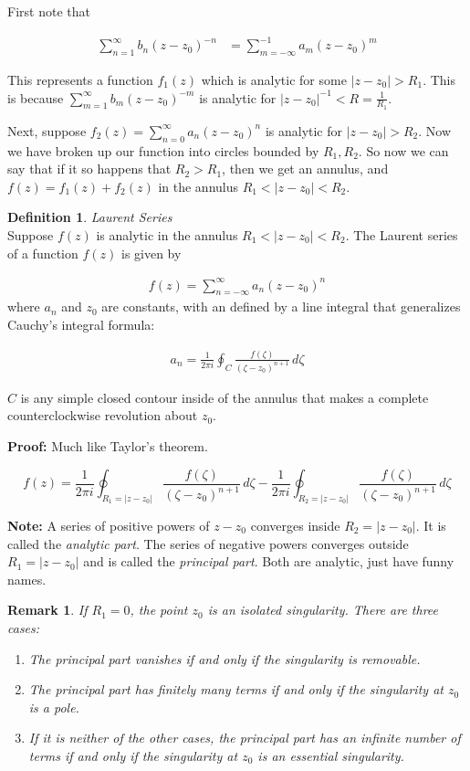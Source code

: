 \documentclass{article}
\newtheorem*{remark}{Remark}
\theoremstyle{definition}
\newtheorem{definition}{Definition}[section]
\newcommand{\Def}[2]{
\begin{shaded*}
\begin{definition}{\textit{#1}}\\#2\end{definition}
\end{shaded*}
}
\begin{document}
First note that 

\begin{align*}
\sum_{n=1}^\infty b_n(z-z_0)^{-n} & = \sum_{m=-\infty}^{-1} a_m (z-z_0)^m
\end{align*}

This represents a function $f_1(z)$ which is analytic for some $|z-z_0|>R_1$. This is because $\sum_{m=1}^\infty b_m(z-z_0)^{-m}$ is analytic for $|z-z_0|^{-1}<R = \frac{1}{R_1}$. 

Next, suppose $f_2(z) = \sum_{n=0}^\infty a_n(z-z_0)^n$ is analytic for $|z-z_0|>R_2$. Now we have broken up our function into circles bounded by $R_1, R_2$. So now we can say that if it so happens that $R_2>R_1$, then we get an annulus, and $f(z) = f_1(z) + f_2(z)$ in the annulus $R_1  < |z-z_0| < R_2$. 

\Def{Laurent Series}{
Suppose $f(z)$ is analytic in the annulus $R_1  < |z-z_0| < R_2$. 
The Laurent series of a function $f(z)$ is given by

\begin{align*}
f(z)=\sum _{n=-\infty }^{\infty }a_{n}(z-z_0)^{n}
\end{align*}
where $a_n$ and $z_0$ are constants, with an defined by a line integral that generalizes Cauchy's integral formula:

\begin{align*}
a_{n}={\frac {1}{2\pi i}}\oint _{C }{\frac {f(\zeta)}{(\zeta-z_0)^{n+1}}}\,d\zeta
\end{align*}

$C$ is any simple closed contour inside of the annulus that makes a complete counterclockwise revolution about $z_0$. 


\textbf{Proof:} Much like Taylor's theorem. 

$$f(z) = {\frac {1}{2\pi i}}\oint _{R_1  = |z-z_0| }{\frac {f(\zeta)}{(\zeta-z_0)^{n+1}}}\,d\zeta - {\frac {1}{2\pi i}}\oint _{R_2  = |z-z_0| }{\frac {f(\zeta)}{(\zeta-z_0)^{n+1}}}\,d\zeta $$
}

\textbf{Note:} A series of positive powers of $z-z_0$ converges inside $R_2  = |z-z_0|$. It is called the \textit{analytic part}. The series of negative powers converges outside $R_1  = |z-z_0|$ and is called the \textit{principal part}. Both are analytic, just have funny names. 

\begin{remark}
If $R_1 = 0$, the point $z_0$ is an isolated singularity. There are three cases:
\begin{enumerate}
	\item The principal part vanishes if and only if the singularity is removable.
	\item The principal part has finitely many terms if and only if the singularity at $z_0$ is a pole.
	\item If it is neither of the other cases, the principal part has an infinite number of terms if and only if the singularity at $z_0$ is an essential singularity. 
\end{enumerate}
\end{remark}
\end{document}
